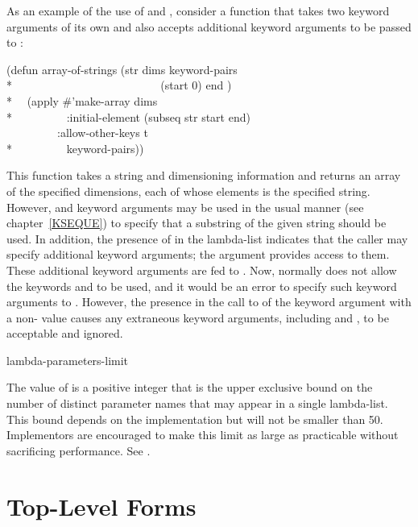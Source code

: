 As an example of the use of  and ,
consider a function that takes two keyword arguments of its own and also
accepts additional keyword arguments to be passed to :
\begin{lisp}
(defun array-of-strings (str dims  keyword-pairs \\*
~~~~~~~~~~~~~~~~~~~~~~~~~ (start 0) end ) \\*
~~(apply \#'make-array dims \\*
~~~~~~~~~:initial-element (subseq str start end) \\
~~~~~~~~~:allow-other-keys t \\*
~~~~~~~~~keyword-pairs))
\end{lisp}
This function takes a string and dimensioning information and returns
an array of the specified dimensions, each of whose elements is the
specified string.  However,  and  keyword arguments
may be used in the usual manner (see chapter~\ref{KSEQUE}) to specify
that a substring of the given string should be used.  In addition,
the presence of  in the lambda-list indicates that the caller
may specify additional keyword arguments; the  argument provides
access to them.  These additional keyword arguments are fed to .
Now,  normally does not allow the keywords 
and  to be used, and it would be an error to specify such
keyword arguments to .  However, the presence in the
call to  of the keyword argument 
with a non-{\false} value causes any extraneous keyword arguments,
including  and , to be acceptable and ignored.


\begin{defun}[Constant]
lambda-parameters-limit

The value of  is a positive integer that is
the upper exclusive bound on the number of distinct parameter names
that may appear in a single lambda-list.
This bound depends on the implementation
but will not be smaller than 50.
Implementors are encouraged to make this limit as large as practicable
without sacrificing performance.
See .
\end{defun}

\section{Top-Level Forms}

